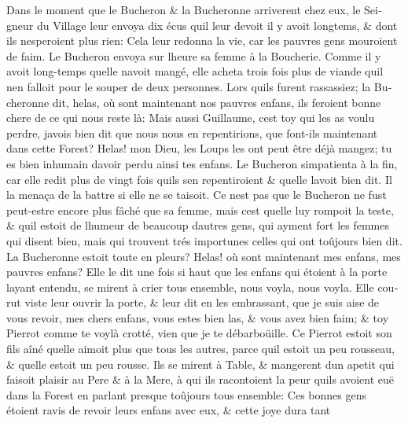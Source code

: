 \documentclass[14pt,a4paper]{memoir}
\begin{document}
\begin{otherlanguage}{french}
Dans le moment que le Bucheron \& la Bucheronne arriverent chez eux, le
Seigneur du Village leur envoya dix écus qu\textquotesingle il leur
devoit il y avoit longtems, \& dont ils n\textquotesingle esperoient
plus rien: Cela leur redonna la vie, car les pauvres gens mouroient de
faim. Le Bucheron envoya sur l\textquotesingle heure sa femme à la
Boucherie. Comme il y avoit long-temps qu\textquotesingle elle
n\textquotesingle avoit mangé, elle acheta trois fois plus de viande
qu\textquotesingle il n\textquotesingle en falloit pour le souper de
deux personnes. Lors qu\textquotesingle ils furent rassassiez; la
Bucheronne dit, helas, où sont maintenant nos pauvres enfans, ils
feroient bonne chere de ce qui nous reste là: Mais aussi Guillaume,
c\textquotesingle est toy qui les as voulu perdre,
j\textquotesingle avois bien dit que nous nous en repentirions, que
font-ils maintenant dans cette Forest? Helas! mon Dieu, les Loups les
ont peut être déjà mangez; tu es bien inhumain d\textquotesingle avoir
perdu ainsi tes enfans. Le Bucheron s\textquotesingle impatienta à la
fin, car elle redit plus de vingt fois qu\textquotesingle ils
s\textquotesingle en repentiroient \& qu\textquotesingle elle
l\textquotesingle avoit bien dit. Il la menaça de la battre si elle ne
se taisoit. Ce n\textquotesingle est pas que le Bucheron ne fust
peut-estre encore plus fâché que sa femme, mais c\textquotesingle est
qu\textquotesingle elle luy rompoit la teste, \& qu\textquotesingle il
estoit de l\textquotesingle humeur de beaucoup d\textquotesingle autres
gens, qui ayment fort les femmes qui disent bien, mais qui trouvent trés
importunes celles qui ont toûjours bien dit. La Bucheronne estoit toute
en pleurs? Helas! où sont maintenant mes enfans, mes pauvres enfans?
Elle le dit une fois si haut que les enfans qui étoient à la porte
l\textquotesingle ayant entendu, se mirent à crier tous ensemble, nous
voyla, nous voyla. Elle courut viste leur ouvrir la porte, \& leur dit
en les embrassant, que je suis aise de vous revoir, mes chers enfans,
vous estes bien las, \& vous avez bien faim; \& toy Pierrot comme te
voylà crotté, vien que je te débarboüille. Ce Pierrot estoit son fils
aîné qu\textquotesingle elle aimoit plus que tous les autres, parce
qu\textquotesingle il estoit un peu rousseau, \& qu\textquotesingle elle
estoit un peu rousse. Ils se mirent à Table, \& mangerent
d\textquotesingle un apetit qui faisoit plaisir au Pere \& à la Mere, à
qui ils racontoient la peur qu\textquotesingle ils avoient euë dans la
Forest en parlant presque toûjours tous ensemble: Ces bonnes gens
étoient ravis de revoir leurs enfans avec eux, \& cette joye dura tant

\end{otherlanguage}
\end{document}

